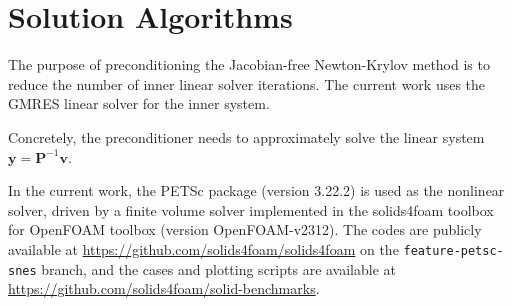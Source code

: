 \documentclass[sn-mathphys,Numbered]{sn-jnl}%
\newcommand{\bb}{\boldsymbol}
\begin{document}
\section{Solution Algorithms}\label{sec:sol_alg}


%


The purpose of preconditioning the Jacobian-free Newton-Krylov method is to reduce the number of inner linear solver iterations.
The current work uses the GMRES linear solver for the inner system.

Concretely, the preconditioner needs to approximately solve the linear system $\bb{y} = \bb{P}^{-1} \bb{v}$.


In the current work, the PETSc package (version 3.22.2) \cite{PETSc} is used as the nonlinear solver, driven by a finite volume solver implemented in the solids4foam toolbox \citep{Cardiff2018, Tukovic2018} for OpenFOAM toolbox \citep{Weller1998} (version OpenFOAM-v2312).
The codes are publicly available at \url{https://github.com/solids4foam/solids4foam} on the \texttt{feature-petsc-snes} branch, and the cases and plotting scripts are available at \url{https://github.com/solids4foam/solid-benchmarks}.
\end{document}
